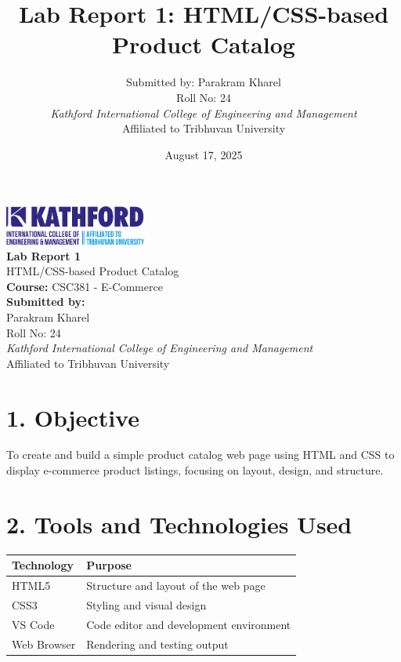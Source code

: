 \documentclass[a4paper,12pt]{article}
\title{Lab Report 1: HTML/CSS-based Product Catalog}
\author{Submitted by: Parakram Kharel \\ Roll No: 24 \\ 
\textit{Kathford International College of Engineering and Management} \\ 
Affiliated to Tribhuvan University}
\begin{document}

\begin{titlepage}
    \begin{center}
        \vspace*{2cm}
        \includegraphics[width=0.35\textwidth]{Kath.png} \\[2cm]

        {\Huge \bfseries Lab Report 1} \\[0.5cm]
        {\Large HTML/CSS-based Product Catalog} \\[2cm]

        {\Large \textbf{Course:} CSC381 - E-Commerce} \\[1cm]
        {\Large \textbf{Submitted by:}} \\[0.3cm]
        {\large Parakram Kharel \\ Roll No: 24} \\[2cm]

        \textit{Kathford International College of Engineering and Management} \\
        Affiliated to Tribhuvan University \\[3cm]

        \date{August 17, 2025}
        {\normalsize \@date}
    \end{center}
\end{titlepage}

\pagestyle{main}
\setlength{\parskip}{1em}

\section*{1. Objective}
To create and build a simple product catalog web page using HTML and CSS to display e-commerce product listings, focusing on layout, design, and structure.


\section*{2. Tools and Technologies Used}
\begin{longtable}{ll}
    \toprule
    \textbf{Technology} & \textbf{Purpose}                        \\
    \midrule
    HTML5               & Structure and layout of the web page    \\
    CSS3                & Styling and visual design               \\
    VS Code             & Code editor and development environment \\
    Web Browser         & Rendering and testing output            \\
    \bottomrule
\end{longtable}
\end{document}
